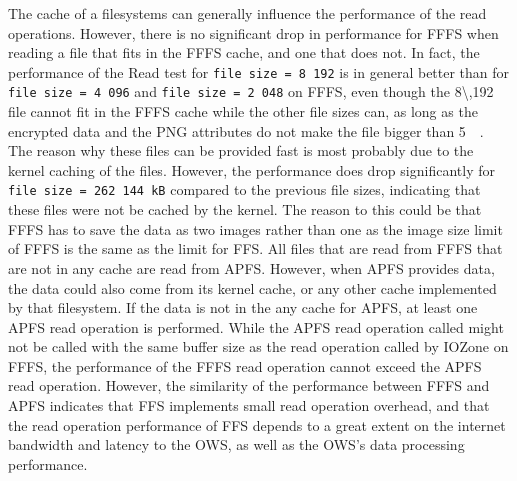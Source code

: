 The cache of a filesystems can generally influence the performance of the read operations. However, there is no significant drop in performance for \gls{FFFS} when reading a file that fits in the \gls{FFFS} cache, and one that does not. In fact, the performance of the Read test for \texttt{file size = 8\,192} is in general better than for \texttt{file size = 4\,096} and \texttt{file size = 2\,048} on \gls{FFFS}, even though the \SI{8\,192}{\kilo\byte} file cannot fit in the \gls{FFFS} cache while the other file sizes can, as long as the encrypted data and the PNG attributes do not make the file bigger than \SI[per-mode = symbol]{5}{\mega\byte}. The reason why these files can be provided fast is most probably due to the kernel caching of the files. However, the performance does drop significantly for \texttt{file size = 262\,144\,kB} compared to the previous file sizes, indicating that these files were not be cached by the kernel. The reason to this could be that \gls{FFFS} has to save the data as two images rather than one as the image size limit of \gls{FFFS} is the same as the limit for \gls{FFS}. All files that are read from \gls{FFFS} that are not in any cache are read from \gls{APFS}. However, when \gls{APFS} provides data, the data could also come from its kernel cache, or any other cache implemented by that filesystem. If the data is not in the any cache for \gls{APFS}, at least one \gls{APFS} read operation is performed. While the \gls{APFS} read operation called might not be called with the same buffer size as the read operation called by IOZone on \gls{FFFS}, the performance of the \gls{FFFS} read operation cannot exceed the \gls{APFS} read operation. However, the similarity of the performance between \gls{FFFS} and \gls{APFS} indicates that \gls{FFS} implements small read operation overhead, and that the read operation performance of \gls{FFS} depends to a great extent on the internet bandwidth and latency to the \gls{OWS}, as well as the \gls{OWS}'s data processing performance.


